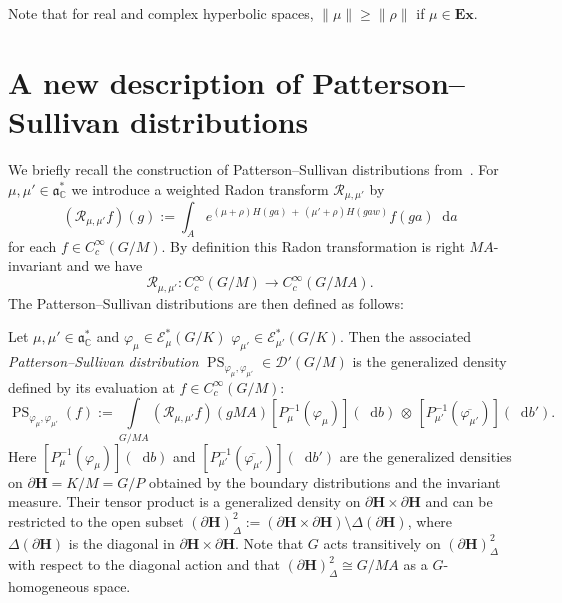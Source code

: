 \documentclass[AHL, Unicode, longabstracts, published]{cedram}
\newcommand{\mc}{\mathcal}
\newcommand{\cc}{\mathbb{C}}
\newcommand{\bfh}{\mathbf{H}}
\newcommand{\pl}{\partial}
\newcommand{\intd}{\mathop{}\!\mathrm{d}}
\renewcommand{\a}{\mathfrak a}
\begin{document}
Note that for real and complex hyperbolic spaces, $\|\mu\|\geq \|\rho\|$ if $\mu\in \mathbf{Ex}$.

\section{A new description of Patterson--Sullivan distributions}\label{PatSul}

We briefly recall the construction of Patterson--Sullivan distributions from~\cite{AZ07,HHS12,HS09}. For $\mu,\mu'\in \a^*_\cc$ we introduce a weighted Radon transform $\mathcal R_{\mu,\mu'}$ by
\[
(\mathcal R_{\mu,\mu'} f)(g):=\int_A e^{(\mu+\rho)H(ga) \,+\,(\mu'+\rho)H(gaw)}f(ga) \intd a
\]
for each $f\in C_c^\infty(G/M)$. By definition this Radon transformation is right $MA$-invariant and we have~\cite[Lemma~4.4]{HHS12}
\[
\mathcal R_{\mu,\mu'}:C_c^\infty(G/M)\to C_c^\infty(G/MA).
\]
The Patterson--Sullivan distributions are then defined as follows:

\begin{defi}\label{def:PS}
Let $\mu,\mu'\in \a_{\cc}^*$ and $\varphi_\mu\in\mathcal E^*_\mu(G/K)$ $\varphi_{\mu'}\in\mathcal E^*_{\mu'}(G/K)$. Then the associated \emph{Patterson--Sullivan distribution} $\operatorname{PS}_{\varphi_\mu,\varphi_{\mu'}} \in \mc{D}'(G/M)$ is the generalized density defined by its evaluation at $f\in C_c^\infty(G/M)$:
\[
\operatorname{PS}_{\varphi_\mu,\varphi_{\mu'}}(f):= \int\limits_{G/MA}\left(\mathcal R_{\mu,\mu'} f\right)(gMA) \left[P_\mu^{-1}(\varphi_\mu)\right](\intd b)\,\otimes\, \left[P_{\mu'}^{-1}(\overline{\varphi_{\mu'}})\right](\intd b').
\]
Here $[P_\mu^{-1}(\varphi_\mu)](\intd b)$ and $[P_{\mu'}^{-1}(\overline{\varphi_{\mu'}})](\intd b')$ are the generalized densities on $\pl{\bfh}=K/M=G/P$ obtained by the boundary distributions and the invariant measure. Their tensor product is a generalized density on $\pl{\bfh}\times \pl{\bfh}$ and can be restricted to the open subset $(\pl{\bfh})^2_{\Delta}:= (\pl{\bfh}\times \pl{\bfh})\setminus \Delta(\pl{\bfh})$, where $\Delta(\pl{\bfh})$ is the diagonal in $\pl{\bfh}\times \pl{\bfh}$. Note that $G$ acts transitively on $(\pl{\bfh})_\Delta^2$ with respect to the diagonal action and that $(\pl{\bfh})_\Delta^2\cong G/MA$ as a $G$-homogeneous space.
\end{defi}
\end{document}

